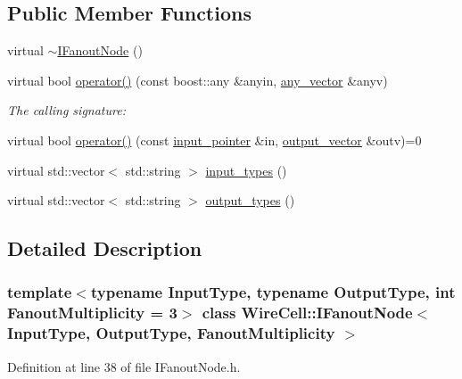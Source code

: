 \subsection*{Public Member Functions}
\begin{DoxyCompactItemize}
\item 
virtual \hyperlink{class_wire_cell_1_1_i_fanout_node_a01b90f003e19845b9c4bf3d1c85b75e7}{$\sim$\+I\+Fanout\+Node} ()
\item 
virtual bool \hyperlink{class_wire_cell_1_1_i_fanout_node_a813e5346a910147df1d57d955c303129}{operator()} (const boost\+::any \&anyin, \hyperlink{class_wire_cell_1_1_i_fanout_node_base_a855b32ed7f2d37d84aaf21e94edeacc4}{any\+\_\+vector} \&anyv)
\begin{DoxyCompactList}\small\item\em The calling signature\+: \end{DoxyCompactList}\item 
virtual bool \hyperlink{class_wire_cell_1_1_i_fanout_node_abcb60d2f89bd18018883d55c9119952f}{operator()} (const \hyperlink{class_wire_cell_1_1_i_fanout_node_aefd36d56a531edf1990fe6e263d9c266}{input\+\_\+pointer} \&in, \hyperlink{class_wire_cell_1_1_i_fanout_node_a650cda83709781daac2d67af7c3706df}{output\+\_\+vector} \&outv)=0
\item 
virtual std\+::vector$<$ std\+::string $>$ \hyperlink{class_wire_cell_1_1_i_fanout_node_a61d7f915d2c0b6275827e7d63b9a03b2}{input\+\_\+types} ()
\item 
virtual std\+::vector$<$ std\+::string $>$ \hyperlink{class_wire_cell_1_1_i_fanout_node_a2191dc9d44b35d6ff4bda5d5356c6ac5}{output\+\_\+types} ()
\end{DoxyCompactItemize}


\subsection{Detailed Description}
\subsubsection*{template$<$typename Input\+Type, typename Output\+Type, int Fanout\+Multiplicity = 3$>$\newline
class Wire\+Cell\+::\+I\+Fanout\+Node$<$ Input\+Type, Output\+Type, Fanout\+Multiplicity $>$}



Definition at line 38 of file I\+Fanout\+Node.\+h.



